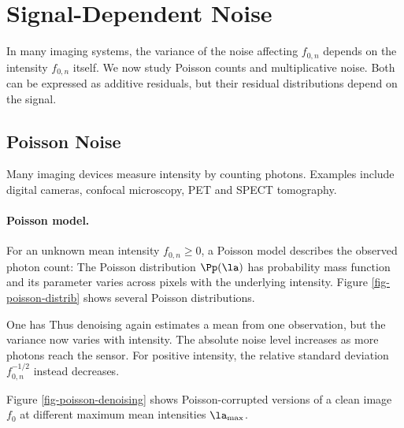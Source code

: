 \section{Signal-Dependent Noise}
\label{sect-data-dept-noises}

In many imaging systems, the variance of the noise affecting $f_{0,n}$ depends on the intensity $f_{0,n}$ itself. We now study Poisson counts and multiplicative noise. Both can be expressed as additive residuals, but their residual distributions depend on the signal.

                                                     
\subsection{Poisson Noise}

Many imaging devices measure intensity by counting photons. Examples include digital cameras, confocal microscopy, PET and SPECT tomography.

  
\paragraph{Poisson model.}

For an unknown mean intensity $f_{0,n}\geq0$, a Poisson model describes the observed photon count:
\eq{
	f_n \sim \Pp(\la)
	\qwhereq \lambda=f_{0,n}\in[0,\infty),
}
The Poisson distribution $\Pp(\la)$ has probability mass function
and its parameter varies across pixels with the underlying intensity. Figure \ref{fig-poisson-distrib} shows several Poisson distributions.


One has 
Thus denoising again estimates a mean from one observation, but the variance now varies with intensity. The absolute noise level increases as more photons reach the sensor. For positive intensity, the relative standard deviation $f_{0,n}^{-1/2}$ instead decreases.

Figure \ref{fig-poisson-denoising} shows Poisson-corrupted versions of a clean image $f_0$ at different maximum mean intensities $\la_{\max}$.


